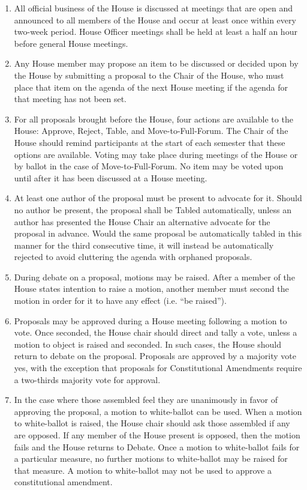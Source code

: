 \documentclass[letterpaper]{article}
\begin{document}
\begin{enumerate}
\begin{enumerate}
\begin{enumerate}
\item All official business of the House is discussed at meetings that are open and announced to all members of the House and occur at least once within every two-week period. House Officer meetings shall be held at least a half an hour before general House meetings.

\item Any House member may propose an item to be discussed or decided upon by the House by submitting a proposal to the Chair of the House, who must place that item on the agenda of the next House meeting if the agenda for that meeting has not been set.

\item For all proposals brought before the House, four actions are available to the House: Approve, Reject, Table, and Move-to-Full-Forum. The Chair of the House should remind participants at the start of each semester that these options are available. Voting may take place during meetings of the House or by ballot in the case of Move-to-Full-Forum. No item may be voted upon until after it has been discussed at a House meeting.

\item At least one author of the proposal must be present to advocate for it. Should no author be present, the proposal shall be Tabled automatically, unless an author has presented the House Chair an alternative advocate for the proposal in advance. Would the same proposal be automatically tabled in this manner for the third consecutive time, it will instead be automatically rejected to avoid cluttering the agenda with orphaned proposals.

\item During debate on a proposal, motions may be raised. After a member of the House states intention to raise a motion, another member must second the motion in order for it to have any effect (i.e. ``be raised'').

\item Proposals may be approved during a House meeting following a motion to vote. Once seconded, the House chair should direct and tally a vote, unless a motion to object is raised and seconded. In such cases, the House should return to debate on the proposal. Proposals are approved by a majority vote yes, with the exception that proposals for Constitutional Amendments require a two-thirds majority vote for approval.

\item In the case where those assembled feel they are unanimously in favor of approving the proposal, a motion to white-ballot can be used. When a motion to white-ballot is raised, the House chair should ask those assembled if any are opposed. If any member of the House present is opposed, then the motion fails and the House returns to Debate. Once a motion to white-ballot fails for a particular measure, no further motions to white-ballot may be raised for that measure. A motion to white-ballot may not be used to approve a constitutional amendment.


\end{enumerate}
\end{enumerate}
\end{enumerate}
\end{document}
